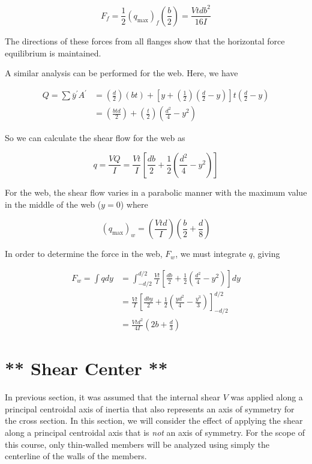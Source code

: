 \documentclass[
10pt,
a4paper,
openany,
svgnames,
]{kaobook} %
\begin{document}
\[F_f = \frac{1}{2}(q_{\max })_f\left( \frac{b}{2} \right) = \frac{Vtdb^2}{16I}\]

The directions of these forces from all flanges show that the horizontal force equilibrium is maintained.

A similar analysis can be performed for the web. Here, we have

\begin{align*}
  Q = \sum \bar y^\prime A^\prime  &= \left( \frac{d}{2} \right)(bt) + \left[ y + \left( \frac{1}{2} \right)\left( \frac{d}{2} - y \right) \right]t\left( \frac{d}{2} - y \right) \\ 
                        &= \left( \frac{btd}{2} \right) + \left( \frac{t}{2} \right)\left( \frac{d^2}{4} - y^2 \right)
\end{align*}	

So we can calculate the shear flow for the web as

\begin{equation}
  q = \frac{VQ}{I} = \frac{Vt}{I}\left[ \frac{{db}}{2} + \frac{1}{2}\left( {\frac{d^2}{4} - y^2} \right) \right]
\end{equation}

For the web, the shear flow varies in a parabolic manner with the maximum value in the middle of the web ($y = 0$) where

\[(q_{\max })_w = \left( \frac{Vtd}{I} \right)\left( \frac{b}{2} + \frac{d}{8} \right)\]	

In order to determine the force in the web, $F_w$, we must integrate $q$, giving

\begin{align}
  {F_w} = \int {qdy}  &= \int_{ - d/2}^{d/2} {\frac{{Vt}}{I}\left[ {\frac{{db}}{2} + \frac{1}{2}\left( {\frac{{{d^2}}}{4} - {y^2}} \right)} \right]dy} \nonumber \\ 
   &= \frac{Vt}{I}\left[ \frac{dby}{2} + \frac{1}{2}\left( \frac{yd^2}{4} - \frac{y^3}{3} \right) \right]_{-d/2}^{d/2} \nonumber \\ 
   &= \frac{Vtd^2}{4I}\left( 2b + \frac{d}{3} \right)
\end{align}

\section{** Shear Center **}

In previous section, it was assumed that the internal shear $V$ was applied along a principal centroidal axis of inertia that also represents an axis of symmetry for the cross section. In this section, we will consider the effect of applying the shear along a principal centroidal axis that is \emph{not} an axis of symmetry. For the scope of this course, only thin-walled members will be analyzed using simply the centerline of the walls of the members.
\end{document}
